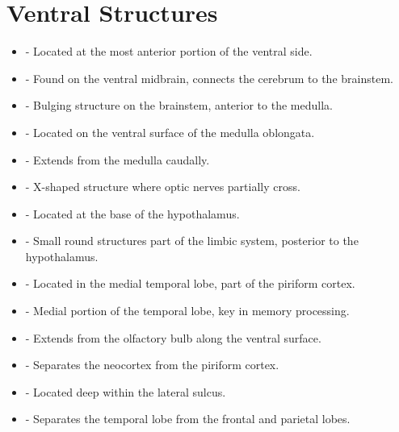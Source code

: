 \section*{Ventral Structures}
\begin{itemize}
    \item {} - Located at the most anterior portion of the ventral side.
    \item {} - Found on the ventral midbrain, connects the cerebrum to the brainstem.
    \item {} - Bulging structure on the brainstem, anterior to the medulla.
    \item {} - Located on the ventral surface of the medulla oblongata.
    \item {} - Extends from the medulla caudally.
    \item {} - X-shaped structure where optic nerves partially cross.
    \item {} - Located at the base of the hypothalamus.
    \item {} - Small round structures part of the limbic system, posterior to the hypothalamus.
    \item {} - Located in the medial temporal lobe, part of the piriform cortex.
    \item {} - Medial portion of the temporal lobe, key in memory processing.
    \item {} - Extends from the olfactory bulb along the ventral surface.
    \item {} - Separates the neocortex from the piriform cortex.
    \item {} - Located deep within the lateral sulcus.
    \item {} - Separates the temporal lobe from the frontal and parietal lobes.
\end{itemize}

